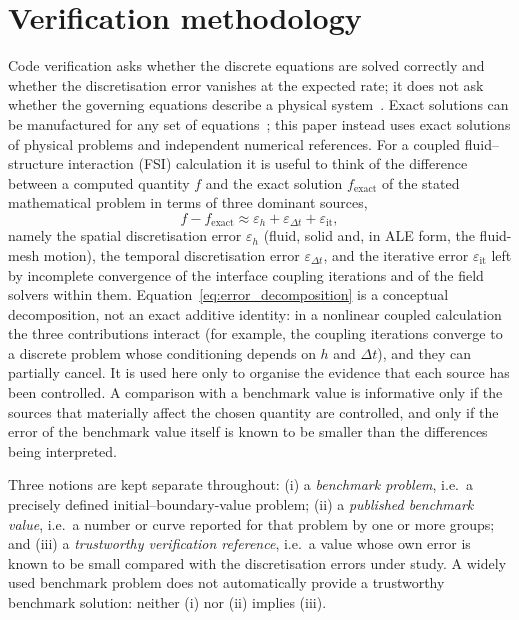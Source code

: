 \section{Verification methodology}\label{sec:verification_methodology}

Code verification asks whether the discrete equations are solved correctly and whether the discretisation error vanishes at the expected rate; it does not ask whether the governing equations describe a physical system~\citep{Roache1998, Roy2005, Oberkampf2008, Oberkampf2010}. Exact solutions can be manufactured for any set of equations~\citep{Roache2002}; this paper instead uses exact solutions of physical problems and independent numerical references.
For a coupled fluid--structure interaction (FSI) calculation it is useful to think of the difference between a computed quantity $f$ and the exact solution $f_\mathrm{exact}$ of the stated mathematical problem in terms of three dominant sources,
\begin{equation}
	f - f_\mathrm{exact} \approx \varepsilon_h + \varepsilon_{\Delta t} + \varepsilon_\mathrm{it},
	\label{eq:error_decomposition}
\end{equation}
namely the spatial discretisation error $\varepsilon_h$ (fluid, solid and, in ALE form, the fluid-mesh motion), the temporal discretisation error $\varepsilon_{\Delta t}$, and the iterative error $\varepsilon_\mathrm{it}$ left by incomplete convergence of the interface coupling iterations and of the field solvers within them.
Equation~\eqref{eq:error_decomposition} is a conceptual decomposition, not an exact additive identity: in a nonlinear coupled calculation the three contributions interact (for example, the coupling iterations converge to a discrete problem whose conditioning depends on $h$ and $\Delta t$), and they can partially cancel.
It is used here only to organise the evidence that each source has been controlled.
A comparison with a benchmark value is informative only if the sources that materially affect the chosen quantity are controlled, and only if the error of the benchmark value itself is known to be smaller than the differences being interpreted.

Three notions are kept separate throughout:
(i) a \emph{benchmark problem}, i.e.\ a precisely defined initial--boundary-value problem;
(ii) a \emph{published benchmark value}, i.e.\ a number or curve reported for that problem by one or more groups; and
(iii) a \emph{trustworthy verification reference}, i.e.\ a value whose own error is known to be small compared with the discretisation errors under study.
A widely used benchmark problem does not automatically provide a trustworthy benchmark solution: neither (i) nor (ii) implies (iii).

